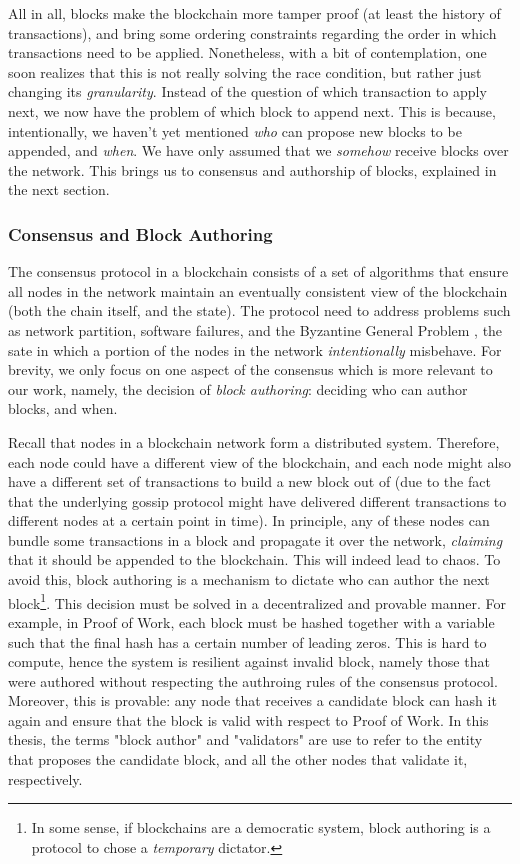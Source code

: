 All in all, blocks make the blockchain more tamper proof (at least the history of transactions), and
bring some ordering constraints regarding the order in which transactions need to be applied. Nonetheless, with
a bit of contemplation, one soon realizes that this is not really solving the race condition, but
rather just changing its \textit{granularity}. Instead of the question of which transaction to apply
next, we now have the problem of which block to append next. This is because, intentionally, we
haven't yet mentioned \textit{who} can propose new blocks to be appended, and \textit{when}. We have
only assumed that we \textit{somehow} receive blocks over the network. This brings us to consensus
and authorship of blocks, explained in the next section.

\subsubsection{Consensus and Block Authoring} \label{chap_bg:subsec:consensus_authorship}

The consensus protocol in a blockchain consists of a set of algorithms that ensure all nodes
in the network maintain an eventually consistent view of the blockchain (both the chain itself, and
the state). The protocol need to address problems such as network partition, software failures, and
the Byzantine General Problem \cite{lamportByzantineGeneralsProblem1982}, the sate in which a
portion of the nodes in the network \textit{intentionally} misbehave. For brevity, we only focus on
one aspect of the consensus which is more relevant to our work, namely, the decision of \textit{block authoring}: deciding who can author blocks, and when.

Recall that nodes in a blockchain network form a distributed system. Therefore, each node could have a different view of the blockchain, and each node
might also have a different set of transactions to build a new block out of (due to the fact that
the underlying gossip protocol might have delivered different transactions to different nodes at a certain point in time). In
principle, any of these nodes can bundle some transactions in a block and propagate it over the
network, \textit{claiming} that it should be appended to the blockchain. This will indeed lead to
chaos. To avoid this, block authoring is a mechanism to dictate who can author the next
block\footnote{In some sense, if blockchains are a democratic system, block authoring is a protocol
to chose a \textit{temporary} dictator.}. This decision must be solved in a decentralized and provable
manner. For example, in Proof of Work, each block must be hashed together with a variable such that the final hash has a certain number of leading zeros. This is hard to compute, hence the system
is resilient against invalid block, namely those that were authored without respecting the authroing rules of the consensus protocol. Moreover, this is provable: any node that receives a candidate block can
hash it again and ensure that the block is valid with respect to Proof of Work. In this thesis, the
terms "block author" and "validators" are use to refer to the  entity that proposes the candidate
block, and all the other nodes that validate it, respectively.


